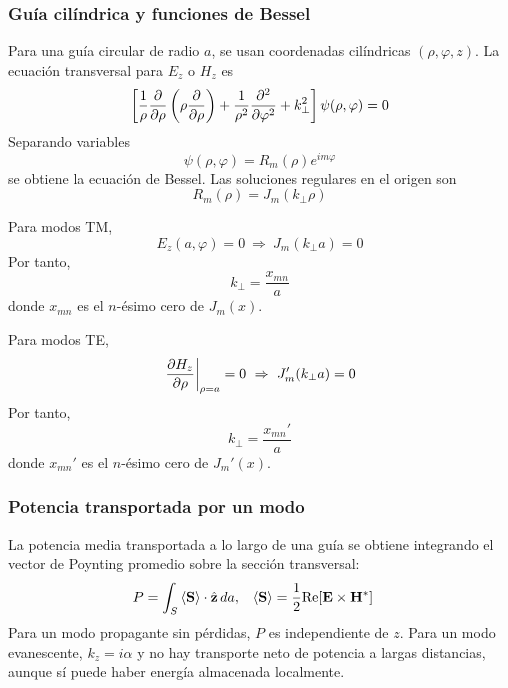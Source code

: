 \documentclass[]{article}
\numberwithin{equation}{section}
\begin{document}
\subsubsection{Guía cilíndrica y funciones de Bessel}
Para una guía circular de radio $a$, se usan coordenadas cilíndricas $(\rho, \varphi, z).$ La ecuación transversal para $E_z$ o $H_z$ es
\begin{equation}
	\left[\frac{1}{\rho} \dfrac{\partial }{\partial \rho}\left(\rho \dfrac{\partial }{\partial \rho}\right) + \frac{1}{\rho^2}\dfrac{\partial ^2}{\partial \varphi^2} + k_\perp^2\right] \psi(\rho,\varphi) = 0
\end{equation}
Separando variables
\begin{equation}
	\psi(\rho,\varphi) = R_m(\rho) e^{i m \varphi}
\end{equation}
se obtiene la ecuación de Bessel. Las soluciones regulares en el origen son
\begin{equation}
	R_m(\rho) = J_m (k_\perp \rho)
\end{equation}

Para modos TM,
\begin{equation}
	E_z(a,\varphi) = 0 ~\Rightarrow~ J_m (k_\perp a) = 0
\end{equation}
Por tanto,
\begin{equation}
	k_\perp = \frac{x_{mn}}{a}
\end{equation}
donde $x_{mn}$ es el $n$-ésimo cero de $J_m(x)$.

Para modos TE,
\begin{equation}
	\left.\dfrac{\partial H_z}{\partial \rho}\right|_{\rho=a} = 0 ~\Rightarrow~ J_m' (k_\perp a) = 0
\end{equation}
Por tanto,
\begin{equation}
	k_\perp = \frac{x_{mn}'}{a}
\end{equation}
donde $x_{mn}'$ es el $n$-ésimo cero de $J_m' (x)$.

\subsubsection{Potencia transportada por un modo}
La potencia media transportada a lo largo de una guía se obtiene integrando el vector de Poynting promedio sobre la sección transversal:
\begin{align}
	P &= \int_{S} \left\langle \mathbf{S} \right\rangle \cdot \hat{\mathbf{z}} \, da, & \left\langle \mathbf{S} \right\rangle &= \frac{1}{2} \mathrm{Re}\!\left[\mathbf{E}\times\mathbf{H}^*\right]
\end{align}
Para un modo propagante sin pérdidas, $P$ es independiente de $z$. Para un modo evanescente, $k_z = i\alpha$ y no hay transporte neto de potencia a largas distancias, aunque sí puede haber energía almacenada localmente.
\end{document}
